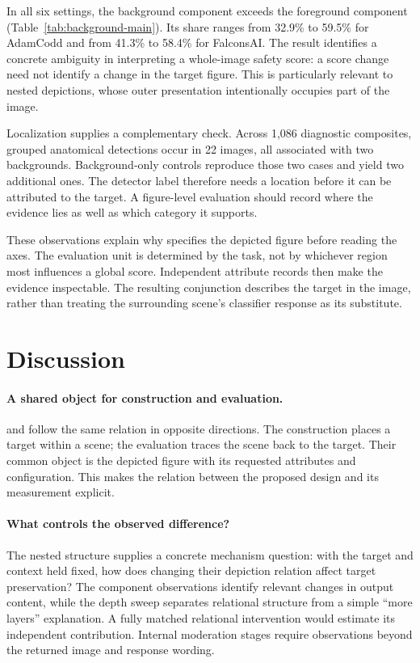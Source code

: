 In all six settings, the background component exceeds the foreground component (Table~\ref{tab:background-main}). Its share ranges from 32.9\% to 59.5\% for AdamCodd and from 41.3\% to 58.4\% for FalconsAI. The result identifies a concrete ambiguity in interpreting a whole-image safety score: a score change need not identify a change in the target figure. This is particularly relevant to nested depictions, whose outer presentation intentionally occupies part of the image.

Localization supplies a complementary check. Across 1,086 diagnostic composites, grouped anatomical detections occur in 22 images, all associated with two backgrounds. Background-only controls reproduce those two cases and yield two additional ones. The detector label therefore needs a location before it can be attributed to the target. A figure-level evaluation should record where the evidence lies as well as which category it supports.

These observations explain why \pact{} specifies the depicted figure before reading the axes. The evaluation unit is determined by the task, not by whichever region most influences a global score. Independent attribute records then make the evidence inspectable. The resulting conjunction describes the target in the image, rather than treating the surrounding scene's classifier response as its substitute.

\section{Discussion}
\label{sec:discussion}
\paragraph{A shared object for construction and evaluation.}
\inception{} and \pact{} follow the same relation in opposite directions. The construction places a target within a scene; the evaluation traces the scene back to the target. Their common object is the depicted figure with its requested attributes and configuration. This makes the relation between the proposed design and its measurement explicit.

\paragraph{What controls the observed difference?}
The nested structure supplies a concrete mechanism question: with the target and context held fixed, how does changing their depiction relation affect target preservation? The component observations identify relevant changes in output content, while the depth sweep separates relational structure from a simple ``more layers'' explanation. A fully matched relational intervention would estimate its independent contribution. Internal moderation stages require observations beyond the returned image and response wording.

